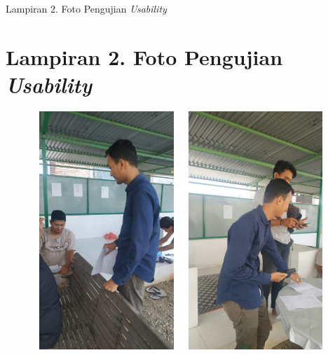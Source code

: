\newpage

\fancyhf{} 
\fancyfoot[R]{\thepage}

\begin{appendices}{Lampiran 2. Foto Pengujian \textit{Usability}}
    \section*{Lampiran 2. Foto Pengujian \textit{Usability}}
    \begin{figure}[H]
            \hspace*{0.8cm}
            \includegraphics[width=5.5cm,height=9cm]{gambar/dokumentasi/foto1}
            \hspace*{0.3cm}
            \includegraphics[width=5.5cm,height=9cm]{gambar/dokumentasi/foto2}
    \end{figure}
        

\end{appendices}
